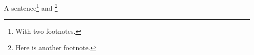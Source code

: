 \documentclass{article}
\begin{document}
A sentence\footnote{With two footnotes.} and \footnote{Here is another footnote.}
\end{document}
